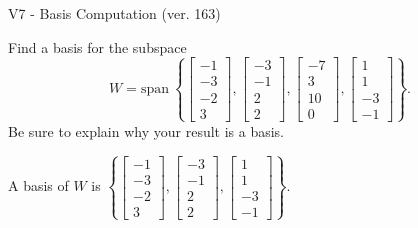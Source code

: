 \begin{exercise}
  \begin{exerciseTitle}V7 - Basis Computation (ver. 163)\end{exerciseTitle}
  \begin{exerciseStatement}
    Find a basis for the subspace 
\[W=\mathrm{span}\ \left\{\left[\begin{array}{r}
-1 \\
-3 \\
-2 \\
3
\end{array}\right] , \left[\begin{array}{r}
-3 \\
-1 \\
2 \\
2
\end{array}\right] , \left[\begin{array}{r}
-7 \\
3 \\
10 \\
0
\end{array}\right] , \left[\begin{array}{r}
1 \\
1 \\
-3 \\
-1
\end{array}\right]\right\}.\]
 Be sure to explain why your result is a basis.


  \end{exerciseStatement}
  \begin{exerciseAnswer}
   A basis of \(W\) is  \(\left\{\left[\begin{array}{r}
-1 \\
-3 \\
-2 \\
3
\end{array}\right] , \left[\begin{array}{r}
-3 \\
-1 \\
2 \\
2
\end{array}\right] , \left[\begin{array}{r}
1 \\
1 \\
-3 \\
-1
\end{array}\right]\right\}\).
  


  \end{exerciseAnswer}
\end{exercise}